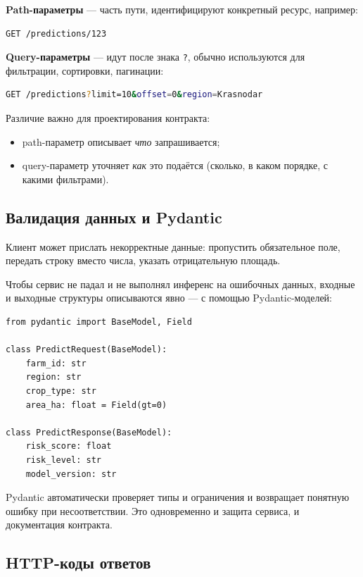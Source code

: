 \documentclass[12pt,a4paper]{article}
\begin{document}
\textbf{Path-параметры} — часть пути, идентифицируют конкретный ресурс, например:

\begin{lstlisting}[language=bash]
GET /predictions/123
\end{lstlisting}

\textbf{Query-параметры} — идут после знака \texttt{?}, обычно используются для фильтрации, сортировки, пагинации:

\begin{lstlisting}[language=bash]
GET /predictions?limit=10&offset=0&region=Krasnodar
\end{lstlisting}

Различие важно для проектирования контракта:

\begin{itemize}
    \item path-параметр описывает \emph{что} запрашивается;
    \item query-параметр уточняет \emph{как} это подаётся (сколько, в каком порядке, с какими фильтрами).
\end{itemize}

\subsection{Валидация данных и Pydantic}

Клиент может прислать некорректные данные: пропустить обязательное поле, передать строку вместо числа, указать отрицательную площадь.

Чтобы сервис не падал и не выполнял инференс на ошибочных данных, входные и выходные структуры описываются явно — с помощью Pydantic-моделей:

\begin{lstlisting}[caption={Pydantic-модели запроса и ответа}]
from pydantic import BaseModel, Field

class PredictRequest(BaseModel):
    farm_id: str
    region: str
    crop_type: str
    area_ha: float = Field(gt=0)

class PredictResponse(BaseModel):
    risk_score: float
    risk_level: str
    model_version: str
\end{lstlisting}

Pydantic автоматически проверяет типы и ограничения и возвращает понятную ошибку при несоответствии. Это одновременно и защита сервиса, и документация контракта.

\subsection{HTTP-коды ответов}
\end{document}
